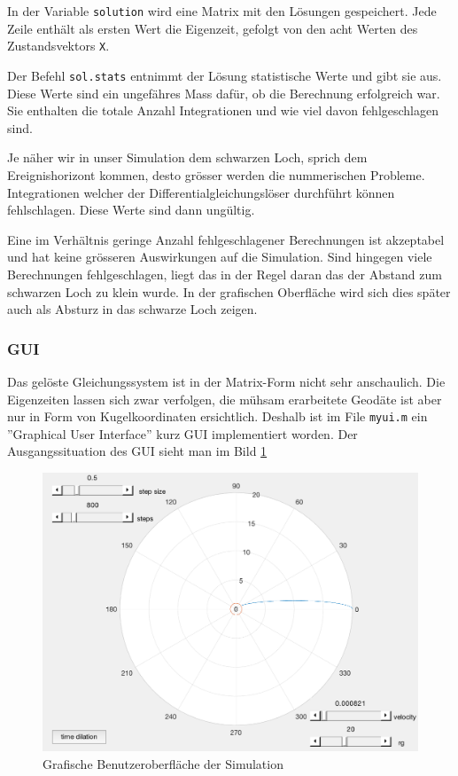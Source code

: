\begin{refsection}
    In der Variable \texttt{solution} wird eine Matrix mit den Lösungen gespeichert. Jede Zeile enthält als ersten Wert die Eigenzeit, gefolgt von den acht Werten des Zustandsvektors \texttt{X}.
    
    Der Befehl \texttt{sol.stats} entnimmt der Lösung statistische Werte und gibt sie aus. Diese Werte sind ein ungefähres Mass dafür, ob die Berechnung erfolgreich war. Sie enthalten die totale Anzahl Integrationen und wie viel davon fehlgeschlagen sind.
    
    Je näher wir in unser Simulation dem schwarzen Loch, sprich dem Ereignishorizont kommen, desto grösser werden die nummerischen Probleme. Integrationen welcher der Differentialgleichungslöser durchführt können fehlschlagen. Diese Werte sind dann ungültig.
    
    Eine im Verhältnis geringe Anzahl fehlgeschlagener Berechnungen ist akzeptabel und hat keine grösseren Auswirkungen auf die Simulation. Sind hingegen viele Berechnungen fehlgeschlagen, liegt das in der Regel daran das der Abstand zum schwarzen Loch zu klein wurde. In der grafischen Oberfläche wird sich dies später auch als Absturz in das schwarze Loch zeigen.
    
    \subsubsection{GUI}
    Das gelöste Gleichungssystem ist in der Matrix-Form nicht sehr anschaulich. Die Eigenzeiten lassen sich zwar verfolgen, die mühsam erarbeitete Geodäte ist aber nur in Form von Kugelkoordinaten ersichtlich. Deshalb ist im File \texttt{myui.m} ein ''Graphical User Interface'' kurz GUI implementiert worden. Der Ausgangssituation des GUI sieht man im Bild \ref{skript:zeitreisen:fig:gui} 
    \begin{figure}[H]
        \centering
        \includegraphics[width=12cm]{zeitreisen/gui.png}
        \caption{Grafische Benutzeroberfläche der Simulation}
        \label{skript:zeitreisen:fig:gui} 
    \end{figure}
    

\end{refsection}
